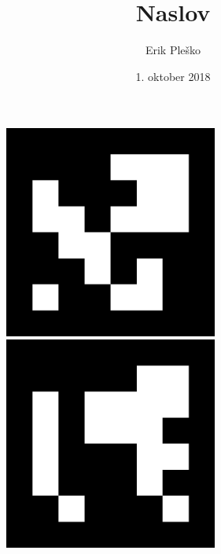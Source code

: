 \documentclass[12pt,a4paper]{article}
\begin{document}
\title{Naslov}

\author{Erik Ple\v sko}

\date{1. oktober 2018}





\begin{figure}[H] 

 

\includegraphics[width=70mm]{6x6marker_000.jpg}
\hspace{2 cm}
\includegraphics[width=70mm]{6x6marker_001.jpg}



\end{figure}
\end{document}
